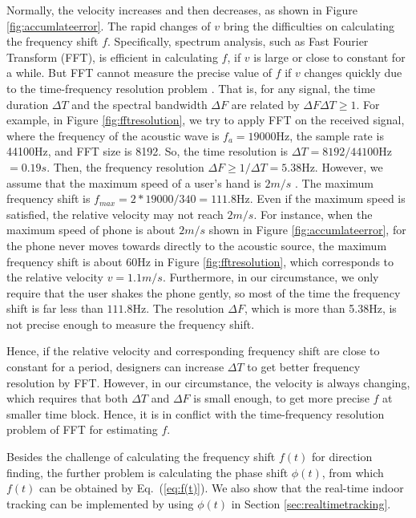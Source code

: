 \documentclass[]{sig-alternate-10pt}
\newcommand{\eqqref}[1]{Eq.~(\ref{#1})}
\begin{document}
 Normally, the velocity increases and then decreases, as
shown in Figure \ref{fig:accumlateerror}. The rapid changes of $v$
bring the difficulties on calculating the frequency shift $f$.
Specifically, spectrum analysis, such as Fast Fourier Transform
(FFT), is efficient in calculating $f$, if $v$ is large or close to constant
for a while. But FFT cannot measure the precise value of $f$ if $v$
changes quickly due to the time-frequency resolution problem
\cite{claerbout1992earth}. That is, for any signal, the time duration
$\Delta T$ and the spectral bandwidth $\Delta F$ are related by
$\Delta F \Delta T \geq 1$.  For example, in Figure
\ref{fig:fftresolution}, we try to apply FFT on the received signal,
where the frequency of the acoustic wave is $f_a=19000$Hz, the sample
rate is 44100Hz, and FFT size is 8192. So, the time resolution is
$\Delta T=8192/44100$Hz$=0.19s$. Then, the frequency resolution
$\Delta F\geq 1/\Delta T=5.38$Hz. However, we assume that the maximum
speed of a user's hand is $2m/s$
\cite{2012-MobiSys-SwordFightenablingnew}.
The maximum frequency shift is
$f_{max}=2*19000/340=111.8$Hz. Even if the maximum speed is
satisfied, the relative velocity may not reach $2m/s$. For instance,
when the maximum speed of phone is
about $2m/s$ shown in Figure \ref{fig:accumlateerror}, for the phone
never moves towards directly to the acoustic source, the maximum
frequency shift is about $60$Hz in Figure \ref{fig:fftresolution},
which corresponds to the relative velocity $v=1.1m/s$.
Furthermore, in our circumstance, we only require that the user shakes the
phone gently, so most of the time the frequency shift is far less than
$111.8$Hz.
The resolution $\Delta F$, which is more than 5.38Hz, is not precise
enough to measure the frequency shift.

Hence, if the relative velocity and corresponding frequency shift are  
close to constant for a period, designers can increase $\Delta T$ to
get better frequency resolution by FFT. However, in our circumstance,
the velocity is always changing, which requires that both $\Delta T$
and $\Delta F$ is small enough, to get more precise $f$ at smaller
time block. Hence, it is in conflict with the time-frequency resolution
problem of FFT for estimating $f$.

Besides the challenge of calculating the frequency shift $f(t)$ for direction finding, the
further problem is calculating the phase shift $\phi(t)$, from which $f(t)$ can be obtained by \eqqref{eq:f(t)}. We also show that the real-time indoor tracking can be implemented by using $\phi(t)$ in Section \ref{sec:realtimetracking}.
\end{document}
